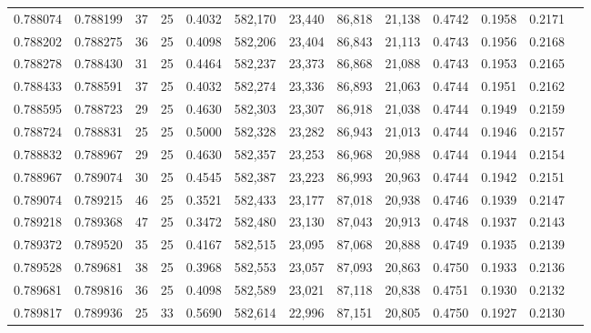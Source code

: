 \begin{tabular}{rrrrrrrrrrrrr}
0.788074 & 0.788199 &    37 &  25 &                                     0.4032 & 582,170 &  23,440 &  86,818 &  21,138 & 0.4742 & 0.1958 & 0.2171 \\
0.788202 & 0.788275 &    36 &  25 &                                     0.4098 & 582,206 &  23,404 &  86,843 &  21,113 & 0.4743 & 0.1956 & 0.2168 \\
0.788278 & 0.788430 &    31 &  25 &                                     0.4464 & 582,237 &  23,373 &  86,868 &  21,088 & 0.4743 & 0.1953 & 0.2165 \\
0.788433 & 0.788591 &    37 &  25 &                                     0.4032 & 582,274 &  23,336 &  86,893 &  21,063 & 0.4744 & 0.1951 & 0.2162 \\
0.788595 & 0.788723 &    29 &  25 &                                     0.4630 & 582,303 &  23,307 &  86,918 &  21,038 & 0.4744 & 0.1949 & 0.2159 \\
0.788724 & 0.788831 &    25 &  25 &                                     0.5000 & 582,328 &  23,282 &  86,943 &  21,013 & 0.4744 & 0.1946 & 0.2157 \\
0.788832 & 0.788967 &    29 &  25 &                                     0.4630 & 582,357 &  23,253 &  86,968 &  20,988 & 0.4744 & 0.1944 & 0.2154 \\
0.788967 & 0.789074 &    30 &  25 &                                     0.4545 & 582,387 &  23,223 &  86,993 &  20,963 & 0.4744 & 0.1942 & 0.2151 \\
0.789074 & 0.789215 &    46 &  25 &                                     0.3521 & 582,433 &  23,177 &  87,018 &  20,938 & 0.4746 & 0.1939 & 0.2147 \\
0.789218 & 0.789368 &    47 &  25 &                                     0.3472 & 582,480 &  23,130 &  87,043 &  20,913 & 0.4748 & 0.1937 & 0.2143 \\
0.789372 & 0.789520 &    35 &  25 &                                     0.4167 & 582,515 &  23,095 &  87,068 &  20,888 & 0.4749 & 0.1935 & 0.2139 \\
0.789528 & 0.789681 &    38 &  25 &                                     0.3968 & 582,553 &  23,057 &  87,093 &  20,863 & 0.4750 & 0.1933 & 0.2136 \\
0.789681 & 0.789816 &    36 &  25 &                                     0.4098 & 582,589 &  23,021 &  87,118 &  20,838 & 0.4751 & 0.1930 & 0.2132 \\
0.789817 & 0.789936 &    25 &  33 &                                     0.5690 & 582,614 &  22,996 &  87,151 &  20,805 & 0.4750 & 0.1927 & 0.2130 \\

\end{tabular}

